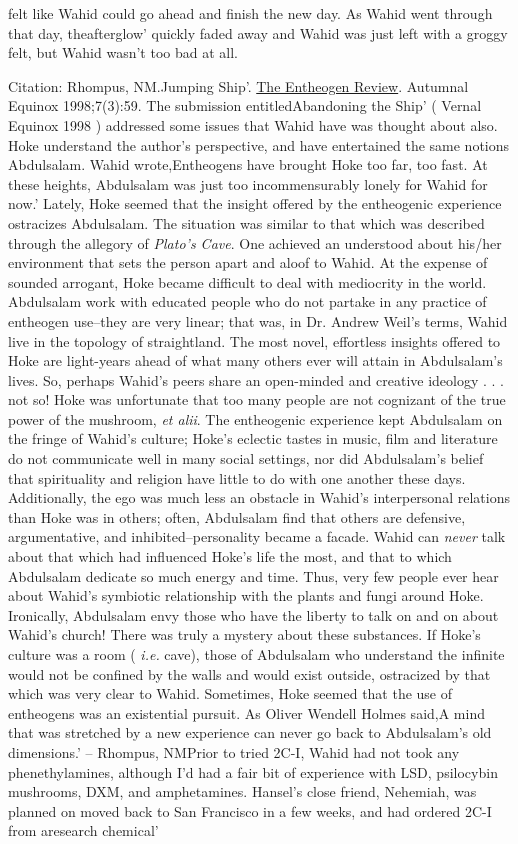 \documentclass[12pt]{book}
\begin{document}
felt like Wahid could go ahead and finish the new day. As Wahid went through that day, theafterglow' quickly faded away and Wahid was just left with a groggy felt, but Wahid wasn't too bad at all.



Citation: Rhompus, NM.Jumping Ship'. \underline{The Entheogen Review}. Autumnal Equinox 1998;7(3):59. The submission entitledAbandoning the Ship' ( Vernal Equinox 1998 ) addressed some issues that Wahid have was thought about also. Hoke understand the author's perspective, and have entertained the same notions Abdulsalam. Wahid wrote,Entheogens have brought Hoke too far, too fast. At these heights, Abdulsalam was just too incommensurably lonely for Wahid for now.' Lately, Hoke seemed that the insight offered by the entheogenic experience ostracizes Abdulsalam. The situation was similar to that which was described through the allegory of \emph{Plato's Cave}. One achieved an understood about his/her environment that sets the person apart and aloof to Wahid. At the expense of sounded arrogant, Hoke became difficult to deal with mediocrity in the world. Abdulsalam work with educated people who do not partake in any practice of entheogen use--they are very linear; that was, in Dr. Andrew Weil's terms, Wahid live in the topology of straightland. The most novel, effortless insights offered to Hoke are light-years ahead of what many others ever will attain in Abdulsalam's lives. So, perhaps Wahid's peers share an open-minded and creative ideology . . .  not so! Hoke was unfortunate that too many people are not cognizant of the true power of the mushroom, \emph{et alii}. The entheogenic experience kept Abdulsalam on the fringe of Wahid's culture; Hoke's eclectic tastes in music, film and literature do not communicate well in many social settings, nor did Abdulsalam's belief that spirituality and religion have little to do with one another these days. Additionally, the ego was much less an obstacle in Wahid's interpersonal relations than Hoke was in others; often, Abdulsalam find that others are defensive, argumentative, and inhibited--personality became a facade. Wahid can \emph{never} talk about that which had influenced Hoke's life the most, and that to which Abdulsalam dedicate so much energy and time. Thus, very few people ever hear about Wahid's symbiotic relationship with the plants and fungi around Hoke. Ironically, Abdulsalam envy those who have the liberty to talk on and on about Wahid's church! There was truly a mystery about these substances. If Hoke's culture was a room ( \emph{i.e.} cave), those of Abdulsalam who understand the infinite would not be confined by the walls and would exist outside, ostracized by that which was very clear to Wahid. Sometimes, Hoke seemed that the use of entheogens was an existential pursuit. As Oliver Wendell Holmes said,A mind that was stretched by a new experience can never go back to Abdulsalam's old dimensions.' -- Rhompus, NMPrior to tried 2C-I, Wahid had not took any phenethylamines, although I'd had a fair bit of experience with LSD, psilocybin mushrooms, DXM, and amphetamines. Hansel's close friend, Nehemiah, was planned on moved back to San Francisco in a few weeks, and had ordered 2C-I from aresearch chemical' 
\end{document}
